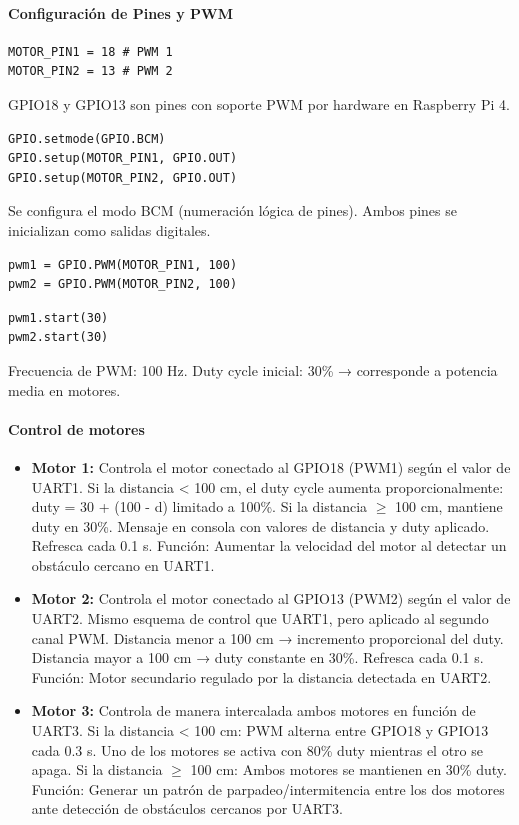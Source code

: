 \documentclass[12pt,a4paper]{article}
\begin{document}
\paragraph{Configuración de Pines y PWM}
\begin{verbatim}
MOTOR_PIN1 = 18 # PWM 1
MOTOR_PIN2 = 13 # PWM 2
\end{verbatim}
GPIO18 y GPIO13 son pines con soporte PWM por hardware en Raspberry Pi 4.
\begin{verbatim}
GPIO.setmode(GPIO.BCM)
GPIO.setup(MOTOR_PIN1, GPIO.OUT)
GPIO.setup(MOTOR_PIN2, GPIO.OUT)
\end{verbatim}
Se configura el modo BCM (numeración lógica de pines). Ambos pines se inicializan como salidas digitales.
\begin{verbatim}
pwm1 = GPIO.PWM(MOTOR_PIN1, 100)
pwm2 = GPIO.PWM(MOTOR_PIN2, 100)
\end{verbatim}
\begin{verbatim}
pwm1.start(30)
pwm2.start(30)
\end{verbatim}
Frecuencia de PWM: 100 Hz. Duty cycle inicial: 30\% → corresponde a potencia media en motores.

\paragraph{Control de motores}
\begin{itemize}
\item \textbf{Motor 1:} Controla el motor conectado al GPIO18 (PWM1) según el valor de UART1. Si la distancia < 100 cm, el duty cycle aumenta proporcionalmente: duty = 30 + (100 - d) limitado a 100\%. Si la distancia $\geq$ 100 cm, mantiene duty en 30\%. Mensaje en consola con valores de distancia y duty aplicado. Refresca cada 0.1 s. Función: Aumentar la velocidad del motor al detectar un obstáculo cercano en UART1.
\item \textbf{Motor 2:} Controla el motor conectado al GPIO13 (PWM2) según el valor de UART2. Mismo esquema de control que UART1, pero aplicado al segundo canal PWM. Distancia menor a 100 cm → incremento proporcional del duty. Distancia mayor a 100 cm → duty constante en 30\%. Refresca cada 0.1 s. Función: Motor secundario regulado por la distancia detectada en UART2.
\item \textbf{Motor 3:} Controla de manera intercalada ambos motores en función de UART3. Si la distancia < 100 cm: PWM alterna entre GPIO18 y GPIO13 cada 0.3 s. Uno de los motores se activa con 80\% duty mientras el otro se apaga. Si la distancia $\geq$ 100 cm: Ambos motores se mantienen en 30\% duty. Función: Generar un patrón de parpadeo/intermitencia entre los dos motores ante detección de obstáculos cercanos por UART3.
\end{itemize}
\end{document}
